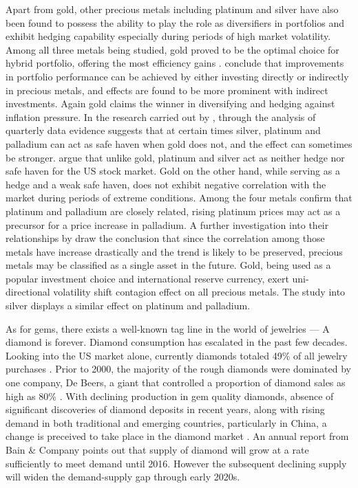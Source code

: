 \documentclass[preprint,authoryear,11pt]{elsarticle}
\begin{document}
Apart from gold, other precious metals including platinum and silver have also been found to possess the ability to play the role as diversifiers in portfolios and exhibit hedging capability especially during periods of high market volatility. Among all three metals being studied, gold proved to be the optimal choice for hybrid portfolio, offering the most efficiency gains \citep{hillier_precious_2006}. \citet{conover_can_2009} conclude that improvements in portfolio performance can be achieved by either investing directly or indirectly in precious metals, and effects are found to be more prominent with indirect investments. Again gold claims the winner in diversifying and hedging against inflation pressure. In the research carried out by \citet{lucey_what_2013}, through the analysis of quarterly data evidence suggests that at certain times silver, platinum and palladium can act as safe haven when gold does not, and the effect can sometimes be stronger. \citet{hood_is_2013} argue that unlike gold, platinum and silver act as neither hedge nor safe haven for the US stock market. Gold on the other hand, while serving as a hedge and a weak safe haven, does not exhibit negative correlation with the market during periods of extreme conditions. Among the four metals \citet{sari_dynamics_2010} confirm that platinum and palladium are closely related, rising platinum prices may act as a precursor for a price increase in palladium. A further investigation into their relationships by \citet{sensoy_dynamic_2013} draw the conclusion that since the correlation among those metals have increase drastically and the trend is likely to be preserved, precious metals may be classified as a single asset in the future. Gold, being used as a popular investment choice and international reserve currency, exert uni-directional volatility shift contagion effect on all precious metals. The study into silver displays a similar effect on platinum and palladium.

As for gems, there exists a well-known tag line in the world of jewelries --- A diamond is forever. Diamond consumption has escalated in the past few decades. Looking into the US market alone, currently diamonds totaled 49\% of all jewelry purchases \citet{webpage}. Prior to 2000, the majority of the rough diamonds were dominated by one company, De Beers, a giant that controlled a proportion of diamond sales as high as 80\% \citet{webpage}. With declining production in gem quality diamonds, absence of significant discoveries of diamond deposits in recent years, along with rising demand in both traditional and emerging countries, particularly in China, a change is preceived to take place in the diamond market \citet{webpage}. An annual report from Bain \& Company \citet{bain2013} points out that supply of diamond will grow at a rate sufficiently to meet demand until 2016. However the subsequent declining supply will widen the demand-supply gap through early 2020s.
\end{document}

